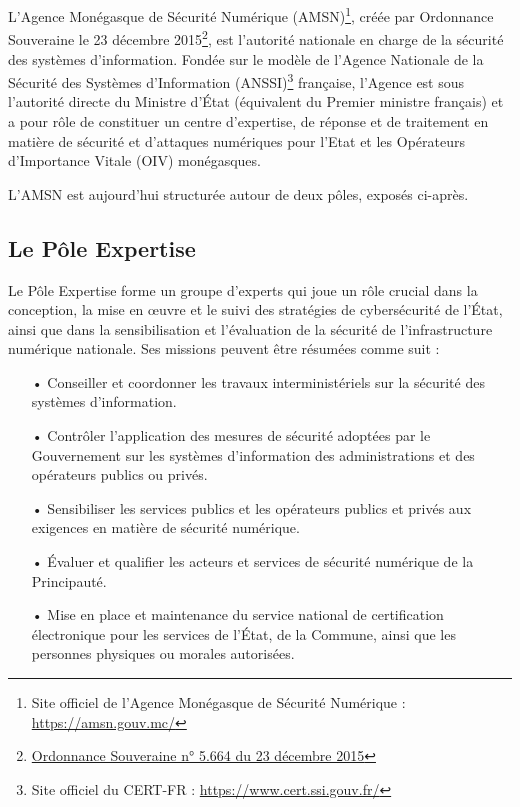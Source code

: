 
L’Agence Monégasque de Sécurité Numérique (AMSN)\footnote{Site officiel de l’Agence Monégasque de Sécurité Numérique : \url{https://amsn.gouv.mc/}}, créée par Ordonnance Souveraine le 23 décembre 2015\footnote{\href{https://journaldemonaco.gouv.mc/Journaux/2015/Journal-8257/Ordonnance-Souveraine-n-5.664-du-23-decembre-2015-creant-l-Agence-Monegasque-de-Securite-Numerique}{Ordonnance Souveraine n° 5.664 du 23 décembre 2015}}, est l’autorité nationale en charge de la sécurité des systèmes d’information. Fondée sur le modèle de l'Agence Nationale de la Sécurité des Systèmes d'Information (ANSSI)\footnote{Site officiel du CERT-FR : \url{https://www.cert.ssi.gouv.fr/}} française, l'Agence est sous l’autorité directe du Ministre d’État (équivalent du Premier ministre français) et a pour rôle de constituer un centre d’expertise, de réponse et de traitement en matière de sécurité et d’attaques numériques pour l’Etat et les Opérateurs d’Importance Vitale (OIV) monégasques.\\

\vspace{1em}

L'AMSN est aujourd'hui structurée autour de deux pôles, exposés ci-après.

\newpage

\subsection{Le Pôle Expertise }

\vspace{1em}

Le Pôle Expertise forme un groupe d'experts qui joue un rôle crucial dans la conception, la mise en œuvre et le suivi des stratégies de cybersécurité de l'État, ainsi que dans la sensibilisation et l'évaluation de la sécurité de l'infrastructure numérique nationale. Ses missions peuvent être résumées comme suit :\\

\begin{itemize}[itemsep=1em]
    \item[•] Conseiller et coordonner les travaux interministériels sur la sécurité des systèmes d'information.
    \item[•] Contrôler l'application des mesures de sécurité adoptées par le Gouvernement sur les systèmes d'information des administrations et des opérateurs publics ou privés.
    \item[•] Sensibiliser les services publics et les opérateurs publics et privés aux exigences en matière de sécurité numérique.
    \item[•] Évaluer et qualifier les acteurs et services de sécurité numérique de la Principauté.
    \item[•] Mise en place et maintenance du service national de certification électronique pour les services de l'État, de la Commune, ainsi que les personnes physiques ou morales autorisées.
\end{itemize}

